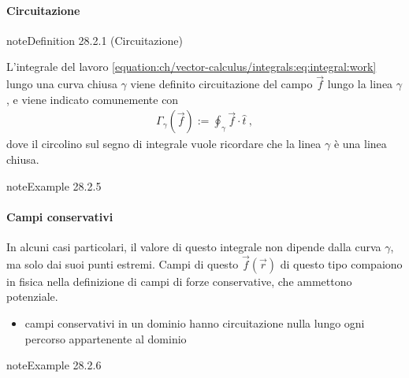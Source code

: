 \documentclass[letterpaper,10pt,italian]{jupyterBook}
\begin{document}
\paragraph{Circuitazione}
\label{\detokenize{ch/vector-calculus/integrals:circuitazione}}\label{\detokenize{ch/vector-calculus/integrals:vector-calculus-integrals-line-circuitation}}\label{ch/vector-calculus/integrals:definition-4}
\begin{sphinxadmonition}{note}{Definition 28.2.1 (Circuitazione)}



\sphinxAtStartPar
L’integrale del lavoro \eqref{equation:ch/vector-calculus/integrals:eq:integral:work} lungo una curva chiusa \(\gamma\) viene definito circuitazione del campo \(\vec{f}\) lungo la linea \(\gamma\), e viene indicato comunemente con
\begin{equation*}
\begin{split}\Gamma_{\gamma}(\vec{f}) := \oint_{\gamma} \vec{f} \cdot \hat{t} \ ,\end{split}
\end{equation*}
\sphinxAtStartPar
dove il circolino sul segno di integrale vuole ricordare che la linea \(\gamma\) è una linea chiusa.
\end{sphinxadmonition}
\label{ch/vector-calculus/integrals:example-5}
\begin{sphinxadmonition}{note}{Example 28.2.5}


\end{sphinxadmonition}


\paragraph{Campi conservativi}
\label{\detokenize{ch/vector-calculus/integrals:campi-conservativi}}\label{\detokenize{ch/vector-calculus/integrals:vector-calculus-integrals-work-conservative}}
\sphinxAtStartPar
In alcuni casi particolari, il valore di questo integrale non dipende dalla curva \(\gamma\), ma solo dai suoi punti estremi. Campi di questo \(\vec{f}(\vec{r})\) di questo tipo compaiono in fisica nella definizione di campi di forze conservative, che ammettono potenziale.

\sphinxAtStartPar
{} 
\begin{itemize}
\item {} 
\sphinxAtStartPar
campi conservativi in un dominio hanno circuitazione nulla lungo ogni percorso appartenente al dominio

\end{itemize}
\label{ch/vector-calculus/integrals:example-6}
\begin{sphinxadmonition}{note}{Example 28.2.6}


\end{sphinxadmonition}
\end{document}
